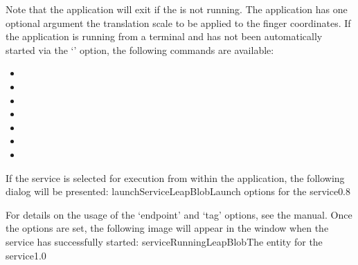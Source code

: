 Note that the application will exit if the \emph{\RS} is not running.
The application has one optional argument \longDash{} the translation scale to be applied
to the finger coordinates.
\insertAppParameters
\insertTagDescription{\LBI}
\insertInputServiceComment
\condPage{}
If the application is running from a terminal and has not been automatically started via
the `' option, the following commands are available:
\begin{itemize}
\item{}
\item\exSp{}
\item\exSp{}
\item\exSp{}
\item\exSp{}
\item\exSp{}
\item\exSp{}
\end{itemize}
\secondaryEnd
\condPage
{}
If the service is selected for execution from within the \emph{\CMU} application, the
following dialog will be presented:
%
{launchServiceLeapBlob}{Launch options for the \emph{\LBI} service}{0.8}

For details on the usage of the `endpoint' and `tag' options, see the \emph{\CMU} manual.
Once the options are set, the following image will appear in the \emph{\CMU} window when
the service has successfully started:
%
{serviceRunningLeapBlob}{The \emph{\CMU} entity for the \emph{\LBI} service}{1.0}
\secondaryEnd
\primaryEnd{}
